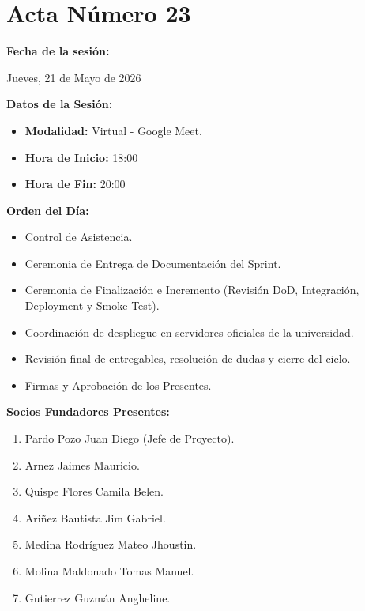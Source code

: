 \newpage
\section{Acta Número 23}
\label{sec:acta23}

\noindent \textbf{Fecha de la sesión:}\par
Jueves, 21 de Mayo de 2026

\vspace*{0.5cm}
\noindent \textbf{Datos de la Sesión:}
\vspace{-0.2cm}
\begin{itemize}[noitemsep]
    \item \textbf{Modalidad:} Virtual - Google Meet.
    \item \textbf{Hora de Inicio:} 18:00
    \item \textbf{Hora de Fin:} 20:00
\end{itemize}

\vspace*{0.5cm}
\noindent \textbf{Orden del Día:}
\vspace{-0.2cm}
\begin{itemize}[noitemsep]
    \item Control de Asistencia.
    \item Ceremonia de Entrega de Documentación del Sprint.
    \item Ceremonia de Finalización e Incremento (Revisión DoD, Integración, Deployment y Smoke Test).
    \item Coordinación de despliegue en servidores oficiales de la universidad.
    \item Revisión final de entregables, resolución de dudas y cierre del ciclo.
    \item Firmas y Aprobación de los Presentes.
\end{itemize}

\vspace*{0.5cm}
\noindent \textbf{Socios Fundadores Presentes:}
\vspace{-0.2cm}
\begin{enumerate}[noitemsep]
    \item Pardo Pozo Juan Diego (Jefe de Proyecto).
    \item Arnez Jaimes Mauricio.
    \item Quispe Flores Camila Belen.
    \item Ariñez Bautista Jim Gabriel.
    \item Medina Rodríguez Mateo Jhoustin.
    \item Molina Maldonado Tomas Manuel.
    \item Gutierrez Guzmán Angheline.
\end{enumerate}

